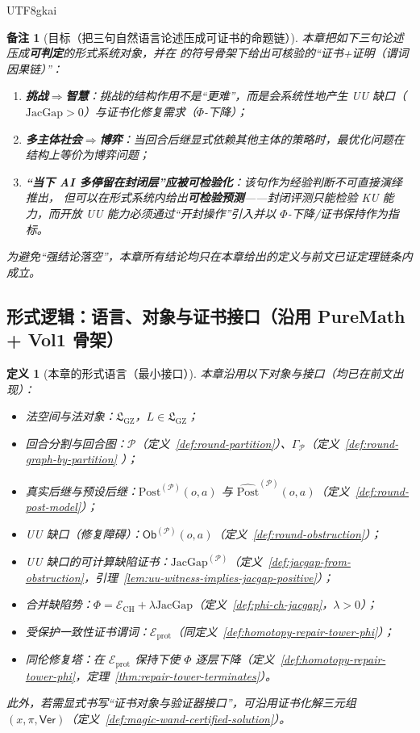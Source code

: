 \documentclass[12pt]{article}
\newtheorem{definition}{定义}[section]
\newtheorem{remark}{备注}[section]
\newcommand{\GFramework}{\text{G-Framework}}
\newcommand{\GZLS}{\ensuremath{\mathfrak{L}_{\mathrm{GZ}}}}
\newcommand{\JacGap}{\ensuremath{\mathrm{JacGap}}} %
\begin{document}
\begin{CJK*}{UTF8}{gkai}
\begin{remark}[目标（把三句自然语言论述压成可证书的命题链）]
本章把如下三句论述压成\textbf{可判定}的形式系统对象，并在 \GFramework{} 的符号骨架下给出可核验的“证书+证明（谓词因果链）”：
\begin{enumerate}
  \item \textbf{挑战$\Rightarrow$智慧}：挑战的结构作用不是“更难”，而是会系统性地产生 UU 缺口（$\JacGap>0$）与证书化修复需求（$\Phi$-下降）；
  \item \textbf{多主体社会$\Rightarrow$博弈}：当回合后继显式依赖其他主体的策略时，最优化问题在结构上等价为博弈问题；
  \item \textbf{“当下 AI 多停留在封闭层”应被可检验化}：该句作为经验判断不可直接演绎推出，
  但可以在形式系统内给出\textbf{可检验预测}——封闭评测只能检验 KU 能力，而开放 UU 能力必须通过“开封操作”引入并以 $\Phi$-下降/证书保持作为指标。
\end{enumerate}
为避免“强结论落空”，本章所有结论均只在本章给出的定义与前文已证定理链条内成立。
\end{remark}

\subsection{形式逻辑：语言、对象与证书接口（沿用 PureMath + Vol1 骨架）}
\label{sec:challenge-language-interface}

\begin{definition}[本章的形式语言（最小接口）]
\label{def:challenge-language-minimal}
本章沿用以下对象与接口（均已在前文出现）：
\begin{itemize}
  \item 法空间与法对象：$\GZLS$，$L\in\GZLS$；
  \item 回合分割与回合图：$\mathcal{P}$（定义~\ref{def:round-partition}）、$\Gamma_{\mathcal{P}}$（定义~\ref{def:round-graph-by-partition}
    ）；
  \item 真实后继与预设后继：$\mathrm{Post}^{(\mathcal{P})}(o,a)$ 与 $\widehat{\mathrm{Post}}^{(\mathcal{P})}(o,a)$（定义~\ref{def:round-post-model}）；
  \item UU 缺口（修复障碍）：$\mathsf{Ob}^{(\mathcal{P})}(o,a)$（定义~\ref{def:round-obstruction}）；
  \item UU 缺口的可计算缺陷证书：$\JacGap^{(\mathcal{P})}$（定义~\ref{def:jacgap-from-obstruction}，引理~\ref{lem:uu-witness-implies-jacgap-positive}）；
  \item 合并缺陷势：$\Phi=\mathcal{E}_{\mathrm{CH}}+\lambda\JacGap$（定义~\ref{def:phi-ch-jacgap}，$\lambda>0$）；
  \item 受保护一致性证书谓词：$\mathcal{E}_{\mathrm{prot}}$（同定义~\ref{def:homotopy-repair-tower-phi}）；
  \item 同伦修复塔：在 $\mathcal{E}_{\mathrm{prot}}$ 保持下使 $\Phi$ 逐层下降（定义~\ref{def:homotopy-repair-tower-phi}，定理~\ref{thm:repair-tower-terminates}）。
\end{itemize}
此外，若需显式书写“证书对象与验证器接口”，可沿用证书化解三元组
$(x,\pi,\mathsf{Ver})$（定义~\ref{def:magic-wand-certified-solution}）。
\end{definition}


\end{CJK*}
\end{document}
